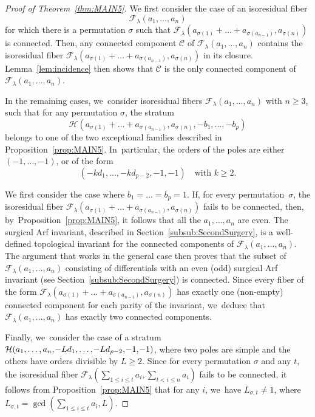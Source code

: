 \begin{proof}[Proof of Theorem~\ref{thm:MAIN5}]
We first consider the case of an isoresidual fiber\vspace*{-3pt}
\[
\mathcal{F}_{\lambda}(a_{1},\dots,a_{n})
\]
for which there is a permutation $\sigma$ such that $\mathcal{F}_{\lambda}(a_{\sigma(1)}+\dots+a_{\sigma(a_{n-1})},a_{\sigma(n)})$ is connected. Then, any connected component $\mathcal{C}$ of $\mathcal{F}_{\lambda}(a_{1},\dots,a_{n})$ contains the isoresidual fiber $\mathcal{F}_{\lambda}(a_{\sigma(1)}+\dots+a_{\sigma(a_{n-1})},a_{\sigma(n)})$ in its closure. Lemma~\ref{lem:incidence} then shows that $\mathcal{C}$ is the only connected component of $\mathcal{F}_{\lambda}(a_{1},\dots,a_{n})$.

In the remaining cases, we~consider isoresidual fibers $\mathcal{F}_{\lambda}(a_{1},\dots,a_{n})$ with $n \geq 3$, such that for any permutation $\sigma$, the stratum\vspace*{-3pt}
\[
\mathcal{H}(a_{\sigma(1)}+\dots+a_{\sigma(a_{n-1})},a_{\sigma(n)},-b_{1},\dots,-b_{p})
\]
belongs to one of the two exceptional families described in
Proposition~\ref{prop:MAIN5}. In~particular, the orders of the poles are either $(-1,\dots,-1)$, or of the form
\[
(-kd_{1},\dots,-kd_{p-2},-1,-1)\quad\text{with }k \geq 2.
\]

We first consider the case where $b_{1}=\dots=b_{p}=1$. If, for every permutation~$\sigma$, the isoresidual fiber $\mathcal{F}_{\lambda}(a_{\sigma(1)}+\dots+a_{\sigma(a_{n-1})},a_{\sigma(n)})$ fails to be connected, then, by~Proposition~\ref{prop:MAIN5}, it follows that all the $a_{1},\dots,a_{n}$ are even. The surgical Arf invariant, described in Section~\ref{subsub:SecondSurgery}, is a well-defined topological invariant for the connected components of $\mathcal{F}_{\lambda}(a_{1},\dots,a_{n})$. The argument that works in the general case then proves that the subset of $\mathcal{F}_{\lambda}(a_{1},\dots,a_{n})$ consisting of differentials with an even (\resp odd) surgical Arf invariant (see Section~\ref{subsub:SecondSurgery}) is connected. Since every fiber of the form $\mathcal{F}_{\lambda}(a_{\sigma(1)}+\dots+a_{\sigma(a_{n-1})},a_{\sigma(n)})$ has exactly one (non-empty) connected component for each parity of the invariant, we~deduce that $\mathcal{F}_{\lambda}(a_{1},\dots,a_{n})$ has exactly two connected components.

Finally, we~consider the case of a stratum $\mathcal{H}(a_{1},\dots,a_{n},\mkern-2mu -Ld_{1},\dots,\mkern-2mu -Ld_{p-2},\mkern-2mu -1,\mkern-2mu -1)$, where two poles are simple and the others have orders divisible by $L \geq 2$. Since for every permutation $\sigma$ and any $t$, the isoresidual fiber $\mathcal{F}_{\lambda}(\sum_{1 \leq i \leq t} a_{i}, \sum_{t< i\leq n} a_{i})$ fails to be connected, it follows from Proposition~\ref{prop:MAIN5} that for any $i$, we~have $L_{\sigma,t} \neq 1$, where $L_{\sigma,t} = \gcd(\sum_{1 \leq i \leq t} a_{i},L)$.


\end{proof}
